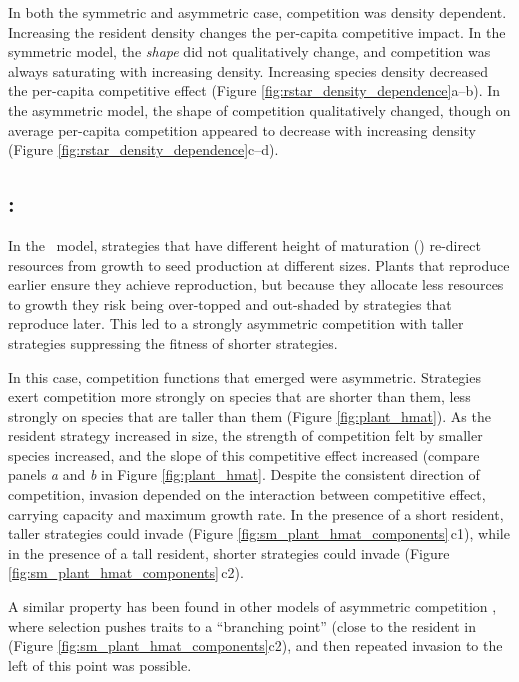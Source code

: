 \documentclass[a4paper,11pt]{article}
\begin{document}
In both the symmetric and asymmetric case, competition was density
dependent.  Increasing the resident density changes the per-capita
competitive impact.
%
In the symmetric model, the \emph{shape} did not qualitatively change,
and competition was always saturating with increasing density.
Increasing species density decreased the per-capita competitive effect
(Figure \ref{fig:rstar_density_dependence}a--b).
%
In the asymmetric model, the shape of competition qualitatively
changed, though on average per-capita competition appeared to decrease
with increasing density (Figure
\ref{fig:rstar_density_dependence}c--d).

\subsection{\plant: \hmat}

In the \plant\ model, strategies that have different height of
maturation (\hmat) re-direct resources from growth to seed production at
different sizes.  Plants that reproduce earlier ensure they achieve
reproduction, but because they allocate less resources to growth they
risk being over-topped and out-shaded by strategies that reproduce
later.  This led to a strongly asymmetric competition with
taller strategies suppressing the fitness of shorter
strategies.

In this case, competition functions that emerged were asymmetric. Strategies exert competition more strongly on species that are shorter than
them, less strongly on species that are taller than them (Figure \ref{fig:plant_hmat}).  As the
resident strategy increased in size, the strength of competition felt
by smaller species increased, and the slope of this competitive effect
increased (compare panels \textit{a} and \textit{b} in Figure
\ref{fig:plant_hmat}.
%
Despite the consistent direction of competition, invasion depended on
the interaction between competitive effect, carrying capacity and
maximum growth rate. In the presence of a short resident, taller
strategies could invade (Figure \ref{fig:sm_plant_hmat_components}\,c1),
while in the presence of a tall resident, shorter strategies could
invade (Figure \ref{fig:sm_plant_hmat_components}\,c2).

A similar property has been found in other models of asymmetric
competition \citep[e.g.,][]{Kisdi-1999}, where selection pushes traits
to a ``branching point'' (close to the resident in (Figure
\ref{fig:sm_plant_hmat_components}c2), and then repeated invasion to
the left of this point was possible.
\end{document}
